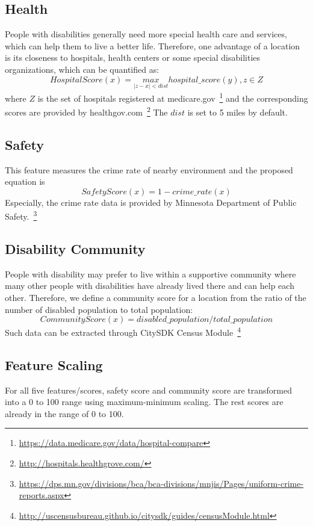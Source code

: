 \documentclass[10pt]{article}
\begin{document}
\subsection{Health}
People with disabilities generally need more special health care and services, which can help them to live a better life. Therefore, one advantage of a location is its closeness to hospitals, health centers or some special disabilities organizations, which can be quantified as:
\begin{equation}
HospitalScore(x) = \underset{|z-x|<dist}{max}hospital\_score(y), z\in Z
\label{eq:hosp}
\end{equation}
 where $Z$ is the set of hospitals registered at medicare.gov~\footnote{\url{https://data.medicare.gov/data/hospital-compare}} and the corresponding scores are provided by healthgov.com~\footnote{\url{http://hospitals.healthgrove.com/}} The $dist$ is set to 5 miles by default.
 
\subsection{Safety}
This feature measures the crime rate of nearby environment and the proposed equation is
\begin{equation}
SafetyScore(x) = 1 - crime\_rate(x)
\end{equation}
Especially, the crime rate data is provided by Minnesota Department of Public Safety.~\footnote{\url{https://dps.mn.gov/divisions/bca/bca-divisions/mnjis/Pages/uniform-crime-reports.aspx}} 

\subsection{Disability Community}
People with disability may prefer to live within a supportive community where many other people with disabilities have already lived there and can help each other. Therefore, we define a community score for a location from the ratio of the number of disabled population to total population:
\begin{equation}
CommunityScore(x) = disabled\_population/total\_population
\end{equation}
 Such data can be extracted through CitySDK Census Module~\footnote{\url{http://uscensusbureau.github.io/citysdk/guides/censusModule.html}}
 
 \subsection{Feature Scaling}
 For all five features/scores, safety score and community score are transformed into a 0 to 100 range using maximum-minimum scaling. The rest scores are already in the range of 0 to 100.
 
\end{document}
